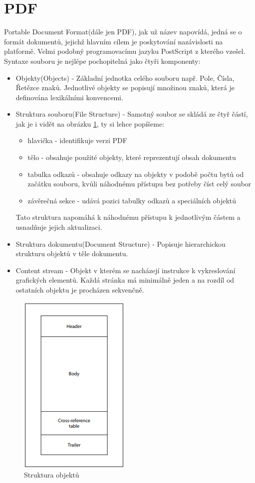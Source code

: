 \section{PDF}
	Portable Document Format(dále jen PDF), jak už název napovídá, jedná se o formát dokumentů, jejichž hlavním cílem je poskytování nazávislosti na platformě. Velmi podobný programovacímu jazyku PostScript z kterého vzešel. Syntaxe souboru je nejlépe pochopitelná jako čtyři komponenty: 
	\begin{itemize}
		\item Objekty(Objects) - Základní jednotka celého souboru např. Pole, Čísla, Řetězce znaků. Jednotlivé objekty se popisují množinou znaků, která je definována lexikálními konvencemi.
		\item Struktura souboru(File Structure) - Samotný soubor se skládá ze čtyř částí, jak je i vidět na obrázku \ref{fig:pdf}, ty si lehce popíšeme: 
			\begin{itemize}
				\item hlavička - identifikuje verzi PDF
				\item tělo - obsahuje použité objekty, které reprezentují obsah dokumentu
				\item tabulka odkazů - obsahuje odkazy na objekty v podobě počtu bytů od začátku souboru, kvůli náhodnému přístupu bez potřeby číst celý soubor
				\item závěrečná sekce - udává pozici tabulky odkazů a speciálních objektů
			\end{itemize}
		Tato struktura napomáhá k náhodnému přístupu k jednotlivým částem a usnadňuje jejich aktualizaci.
		\item Struktura dokumentu(Document Structure) - Popisuje hierarchickou strukturu objektů v těle dokumentu.
		\item Content stream - Objekt v kterém se nacházejí instrukce k vykreslování grafických elementů. Každá stránka má minimálně jeden a na rozdíl od ostatních objektu je procházen sekvenčně.	
	\end{itemize}

	\newpage
	\begin{figure}[H]
		\includegraphics[scale=0.9]{Untitled}
		\centering
		\caption{Struktura objektů}
		\label{fig:pdf}
	\end{figure}


